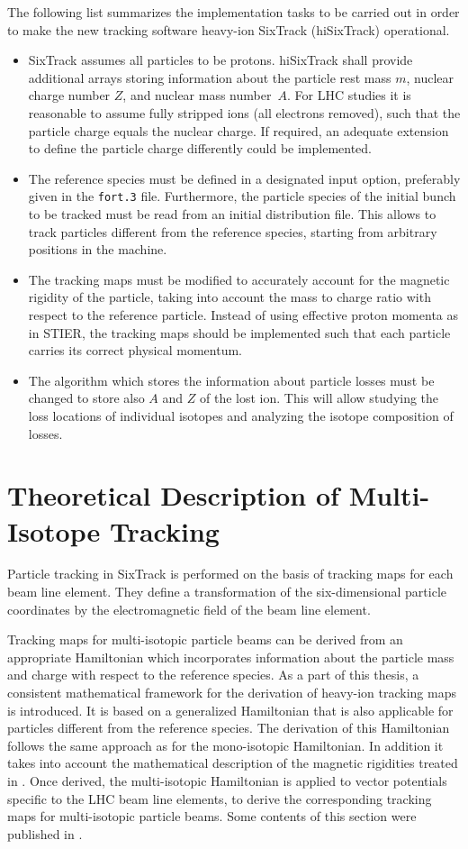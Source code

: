 The following list summarizes the implementation tasks to be carried out in order to make the new tracking software heavy-ion SixTrack (hiSixTrack) operational. 
%
\begin{itemize}
        \item SixTrack assumes all particles to be protons. hiSixTrack shall provide additional arrays storing information about the particle rest mass $m$, nuclear charge number $Z$, and nuclear mass \mbox{number $A$}. For LHC studies it is reasonable to assume fully stripped ions (all electrons removed), such that the particle charge equals the nuclear charge. If required, an adequate extension to define the particle charge differently could be implemented. 
	\item The reference species must be defined in a designated input option, preferably given in the \texttt{fort.3} file. Furthermore, the particle species of the initial bunch to be tracked must be read from an initial distribution file. This allows to track particles different from the reference species, starting from arbitrary positions in the machine. 
\newline
	\item The tracking maps must be modified to accurately account for the magnetic rigidity of the particle, taking into account the mass to charge ratio with respect to the reference particle. Instead of using effective proton momenta as in STIER, the tracking maps should be implemented such that each particle carries its correct physical momentum. 
	\item The algorithm which stores the information about particle losses must be changed to store also $A$ and $Z$ of the lost ion. This will allow studying the loss locations of individual isotopes and analyzing the isotope composition of losses. 
\end{itemize}


\section{Theoretical Description of Multi-Isotope Tracking} \label{chap:multitrack}
%
Particle tracking in SixTrack is performed on the basis of tracking maps for each beam line element. They define a transformation of the six-dimensional particle coordinates by the electromagnetic field of the beam line element.

Tracking maps for multi-isotopic particle beams can be derived from an appropriate Hamiltonian which incorporates information about the particle mass and charge with respect to the reference species. As a part of this thesis, a consistent mathematical framework for the derivation of heavy-ion tracking maps is introduced. It is based on a  generalized Hamiltonian that is also applicable for particles different from the reference species. The derivation of this Hamiltonian follows the same approach as for the mono-isotopic Hamiltonian. In addition it takes into account the mathematical description of the magnetic rigidities treated in . Once derived, the multi-isotopic Hamiltonian is applied to vector potentials specific to the LHC beam line elements, to derive the corresponding tracking maps for multi-isotopic particle beams. Some contents of this section were published in \cite{IPAC16:TUPMW015}.
%
